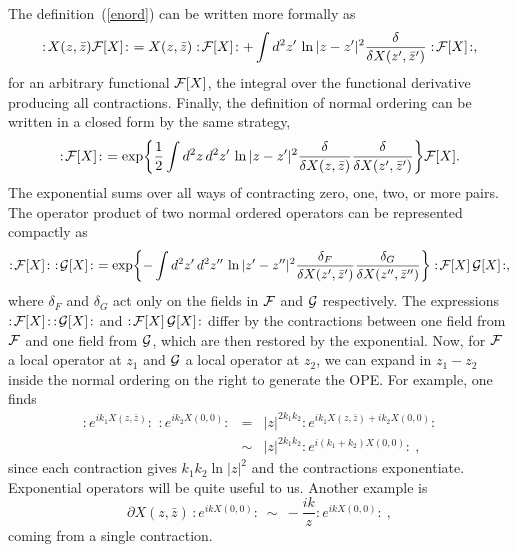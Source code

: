 The definition~(\ref{enord}) can be written more formally as
\begin{equation}
:\! X(z,\bar z) {\cal F}[X] \! :\ = 
X(z,\bar z) :\! {\cal F}[X] \! :
+ \int d^2 z' \, \ln|z-z'|^2 \frac{\delta}{\delta
X(z',\bar z')}:\! {\cal F}[X] \! :,
\end{equation}
for an arbitrary functional ${\cal F}[X]$,
the integral over the functional derivative producing all 
contractions.  Finally, the definition of normal ordering can be
written in a closed form by the same strategy,
\begin{equation}
:\! {\cal F}[X] \! :\ = 
\exp\biggl\{ \frac{1}{2} \int d^2z\,d^2 z' \, \ln|z-z'|^2
\frac{\delta}{\delta X(z,\bar z)}
\frac{\delta}{\delta X(z',\bar z')} \biggr\}
{\cal F}[X].
\end{equation}
The exponential sums over all ways of contracting zero, one, two,
or more pairs.
The operator product of two normal ordered operators can be
represented compactly as
\begin{equation}
:\! {\cal F}[X] \! :\,\, :\! {\cal G}[X] \! :\ = 
\exp\biggl\{ -\int d^2z'\,d^2 z'' \, \ln|z'-z''|^2
\frac{\delta_F}{\delta X(z',\bar z')}
\frac{\delta_G}{\delta X(z'',\bar z'')} \biggr\}
:\! {\cal F}[X]\,{\cal G}[X] \! :,
\end{equation}
where $\delta_F$ and $\delta_G$ act only on the fields in
${\cal F}$ and ${\cal G}$ respectively.  The expressions
$:\! {\cal F}[X] \! :\, :\! {\cal G}[X] \! : $ and
$:\! {\cal F}[X]\,{\cal G}[X] \! :$ differ by the contractions
between one field from ${\cal F}$ and one field from ${\cal G}$,
which are then restored by the exponential.  Now, for ${\cal F}$ a
local operator at $z_1$ and ${\cal G}$ a local operator at
$z_2$, we can expand in $z_1 - z_2$ inside the normal ordering on
the right to generate the OPE.  For example, one finds
\begin{eqnarray}
:\! e^{i k_1 X(z,\bar z)} \! :\,\, :\! e^{i k_2 X(0,0)}
\! :&=& |z|^{2k_1 k_2}
:\! e^{i k_1 X(z,\bar z) + i k_2 X(0,0)}
\! : \nonumber\\
&\sim& |z|^{2k_1 k_2}
:\! e^{i (k_1 + k_2) X(0,0)} \! : \ ,
\end{eqnarray}
since each contraction gives $k_1 k_2 \ln|z|^2$ and the contractions
exponentiate.  Exponential operators will be quite useful to us.
Another example is
\begin{equation}
\partial X(z,\bar z)\, :\! e^{i k X(0,0)} \! :
\ \sim\ -\frac{ik}{z}
:\! e^{i k X(0,0)} \! : \ ,
\end{equation}
coming from a single contraction.

